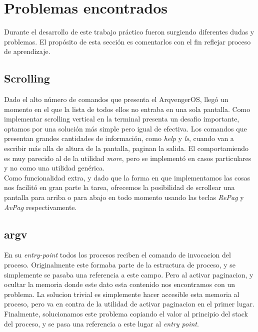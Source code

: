 \documentclass[a4paper,10pt]{article}
\begin{document}
\newpage
\section{Problemas encontrados}

Durante el desarrollo de este trabajo práctico fueron surgiendo diferentes dudas y problemas. El propósito de esta
sección es comentarlos con el fin reflejar proceso de aprendizaje.

        \subsection{Scrolling}
        Dado el alto número de comandos que presenta el ArqvengerOS, llegó un momento en el que la lista de todos ellos no entraba en una sola pantalla.
        Como implementar scrolling vertical en la terminal presenta un desafio importante, optamos por una solución más simple pero igual de efectiva.
        Los comandos que presentan grandes cantidades de información, como \textit{help} y \textit{ls}, cuando van a escribir más alla de altura de la pantalla, 
        paginan la salida.
        El comportamiendo es muy parecido al de la utilidad \textit{more}, pero se implementó en casos particulares y no como una utilidad genérica. \\


        Como funcionalidad extra, y dado que la forma en que implementamos las cosas nos facilitó en gran parte la tarea, ofrecemos la posibilidad de scrollear una 
        pantalla para arriba o para abajo en todo momento usando las teclas \textit{RePag} y \textit{AvPag} respectivamente.

        \subsection{argv}
        En su \textit{entry-point} todos los procesos reciben el comando de invocacion del proceso.
        Originalmente este formaba parte de la estructura de proceso, y se simplemente se pasaba una referencia a este campo.
        Pero al activar paginacion, y ocultar la memoria donde este dato esta contenido nos encontramos con un problema.
        La solucion trivial es simplemente hacer accesible esta memoria al proceso, pero va en contra de la utilidad de activar paginacion en el primer lugar.
        Finalmente, solucionamos este problema copiando el valor al principio del stack del proceso, y se pasa una referencia a este lugar al \textit{entry point}.
\end{document}
